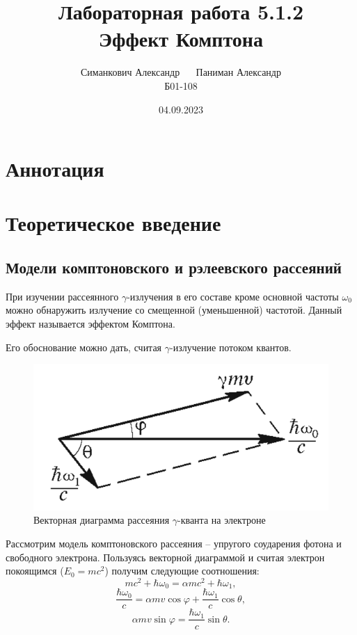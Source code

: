 \documentclass[12pt,a4paper]{article}
\title{Лабораторная работа 5.1.2 \\ Эффект Комптона}
\author{Симанкович Александр $\quad$ Паниман Александр\\ Б01-108}
\date{04.09.2023}
\begin{document}
	\maketitle
	
	\section*{Аннотация}
	
		
	\section*{Теоретическое введение}
	
	\subsection*{Модели комптоновского и рэлеевского рассеяний}
	При изучении рассеянного $\gamma$-излучения в его составе кроме основной частоты $\omega_0$ можно обнаружить излучение со смещенной ($\textit{уменьшенной}$) частотой. Данный эффект называется эффектом Комптона.
	
	Его обоснование можно дать, считая $\gamma$-излучение потоком квантов.

	\begin{figure}[h]
		\includegraphics[scale=0.65]{res/impulse_diagram.png}
		\caption{Векторная диаграмма рассеяния $\gamma$-кванта на электроне}
		\label{fig:impulse_diagram}
	\end{figure}
	
	Рассмотрим модель комптоновского рассеяния -- упругого соударения фотона и свободного электрона. Пользуясь векторной диаграммой и считая электрон покоящимся ($E_0 = mc^2$) получим следующие соотношения:
	$$ mc^2  + \hbar \omega_0 = \alpha m c^2 + \hbar \omega_1, $$
	$$ \frac{\hbar \omega_0}{c} = \alpha m v \cos \varphi + \frac{\hbar \omega_1}{c} \cos \theta, $$
	$$ \alpha m v \sin \varphi = \frac{\hbar \omega_1}{c} \sin \theta.$$
	
\end{document}
